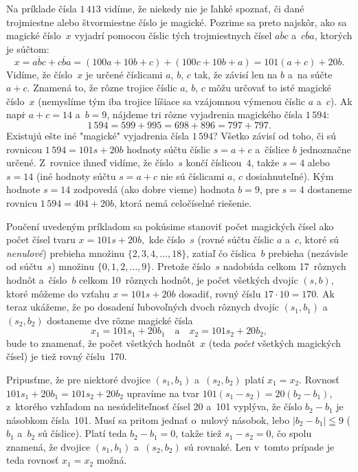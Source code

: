 {%
Na príklade čísla $1\,413$ vidíme, že niekedy nie je ľahké spoznať,
či dané trojmiestne alebo štvormiestne číslo je magické.
Pozrime sa preto najskôr, ako sa magické číslo~$x$ vyjadrí
pomocou číslic tých trojmiestnych čísel $\overline{abc}$ a~$\overline{cba}$,
ktorých je súčtom:
$$
x=\overline{abc}+\overline{cba}=(100a+10b+c)+(100c+10b+a)=101(a+c)+20b.
$$
Vidíme, že číslo~$x$ je určené číslicami $a$, $b$, $c$ tak, že
závisí len na $b$ a~na súčte $a+c$. Znamená to, že rôzne trojice
číslic $a$, $b$, $c$ môžu určovať to isté magické číslo~$x$
(nemyslíme tým iba trojice líšiace sa vzájomnou výmenou
číslic $a$ a~$c$).
Ak napr\. $a+c=14$ a~$b=9$, nájdeme tri rôzne vyjadrenia magického
čísla $1\,594$:
$$
1\,594=599+995=698+896=797+797.
$$
Existujú ešte iné "magické" vyjadrenia čísla $1\,594$? Všetko
závisí od toho, či sú rovnicou
$
1\,594=101s+20b
$
hodnoty súčtu číslic $s=a+c$ a~číslice $b$ jednoznačne určené.
Z~rovnice ihneď vidíme, že číslo~$s$ končí číslicou~$4$, takže $s=4$
alebo $s=14$ (iné hodnoty súčtu $s=a+c$ nie sú číslicami $a$, $c$
dosiahnuteľné). Kým hodnote $s=14$ zodpovedá (ako dobre vieme)
hodnota $b=9$, pre $s=4$ dostaneme rovnicu $1\,594=404+20b$, ktorá
nemá celočíselné riešenie.

Poučení uvedeným príkladom sa pokúsime stanoviť počet magických
čísel ako počet čísel tvaru
$
x=101s+20b,
$
kde číslo~$s$ (rovné súčtu číslic $a$ a~$c$, ktoré sú
{\it nenulové\/}) prebieha množinu $\{2,3,4,\dots,18\}$, zatiaľ čo
číslica~$b$ prebieha (nezávisle od súčtu~$s$) množinu
$\{0,1,2,\dots,9\}$. Pretože číslo~$s$ nadobúda celkom
17~rôznych hodnôt a~číslo~$b$ celkom 10~rôznych hodnôt, je počet
všetkých dvojíc $(s,b)$, ktoré môžeme do vzťahu $x=101s+20b$
dosadiť, rovný číslu $17\cdot10=170$. Ak teraz ukážeme, že po
dosadení ľubovoľných dvoch rôznych dvojíc $(s_1,b_1)$ a~$(s_2,b_2)$
dostaneme dve rôzne magické čísla
$$
x_1=101s_1+20b_1\quad\text{a}\quad x_2=101s_2+20b_2,
$$
bude to znamenať, že počet všetkých hodnôt~$x$ (teda {\it počet\/}
všetkých magických čísel) je tiež rovný číslu~170.

Pripusťme, že pre niektoré dvojice $(s_1,b_1)$ a~$(s_2,b_2)$ platí
$x_1=x_2$. Rovnosť
$
101s_1+20b_1=101s_2+20b_2
$
upravíme na tvar
$101(s_1-s_2)=20(b_2 -b_1)$, z~ktorého vzhľadom na nesúdeliteľnosť
čísel 20 a~101 vyplýva, že číslo $b_2 -b_1$ je násobkom
čísla~101. Musí sa pritom jednať o~nulový násobok, lebo
$|b_2-b_1|\leqq 9$ ($b_1$ a~$b_2$ sú číslice). Platí teda $b_2
-b_1=0$, takže tiež $s_1-s_2=0$, čo spolu znamená, že
dvojice $(s_1,b_1)$ a~$(s_2,b_2)$ sú rovnaké. Len v~tomto
prípade je teda rovnosť $x_1=x_2$ možná.

}
